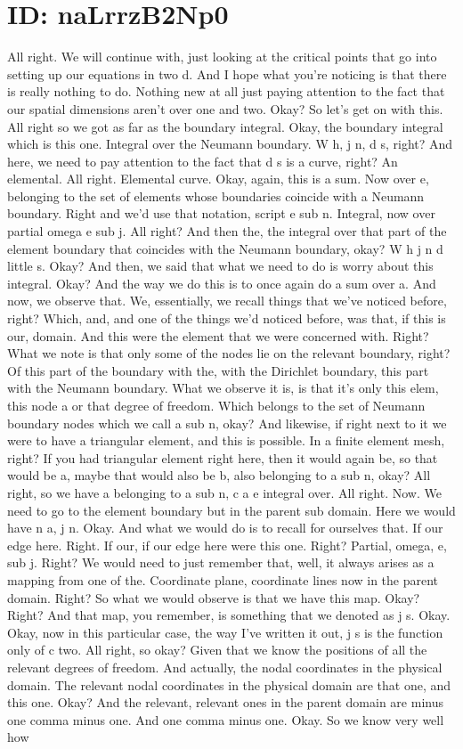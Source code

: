 \documentclass[10pt]{article}
\begin{document}
\section*{ID: naLrrzB2Np0}
All right. We will continue with, just looking at the critical points that go into setting up our equations in two d. And I hope what you're noticing is that there is really nothing to do. Nothing new at all just paying attention to the fact that our spatial dimensions aren't over one and two. Okay? So let's get on with this. All right so we got as far as the boundary integral. Okay, the boundary integral which is this one. Integral over the Neumann boundary. W h, j n, d s, right? And here, we need to pay attention to the fact that d s is a curve, right? An elemental. All right. Elemental curve. Okay, again, this is a sum. Now over e, belonging to the set of elements whose boundaries coincide with a Neumann boundary. Right and we'd use that notation, script e sub n. Integral, now over partial omega e sub j. All right? And then the, the integral over that part of the element boundary that coincides with the Neumann boundary, okay? W h j n d little s. Okay? And then, we said that what we need to do is worry about this integral. Okay? And the way we do this is to once again do a sum over a. And now, we observe that. We, essentially, we recall things that we've noticed before, right? Which, and, and one of the things we'd noticed before, was that, if this is our, domain. And this were the element that we were concerned with. Right? What we note is that only some of the nodes lie on the relevant boundary, right? Of this part of the boundary with the, with the Dirichlet boundary, this part with the Neumann boundary. What we observe it is, is that it's only this elem, this node a or that degree of freedom. Which belongs to the set of Neumann boundary nodes which we call a sub n, okay? And likewise, if right next to it we were to have a triangular element, and this is possible. In a finite element mesh, right? If you had triangular element right here, then it would again be, so that would be a, maybe that would also be b, also belonging to a sub n, okay? All right, so we have a belonging to a sub n, c a e integral over. All right. Now. We need to go to the element boundary but in the parent sub domain. Here we would have n a, j n. Okay. And what we would do is to recall for ourselves that. If our edge here. Right. If our, if our edge here were this one. Right? Partial, omega, e, sub j. Right? We would need to just remember that, well, it always arises as a mapping from one of the. Coordinate plane, coordinate lines now in the parent domain. Right? So what we would observe is that we have this map. Okay? Right? And that map, you remember, is something that we denoted as j s. Okay. Okay, now in this particular case, the way I've written it out, j s is the function only of c two. All right, so okay? Given that we know the positions of all the relevant degrees of freedom. And actually, the nodal coordinates in the physical domain. The relevant nodal coordinates in the physical domain are that one, and this one. Okay? And the relevant, relevant ones in the parent domain are minus one comma minus one. And one comma minus one. Okay. So we know very well how 
\end{document}
